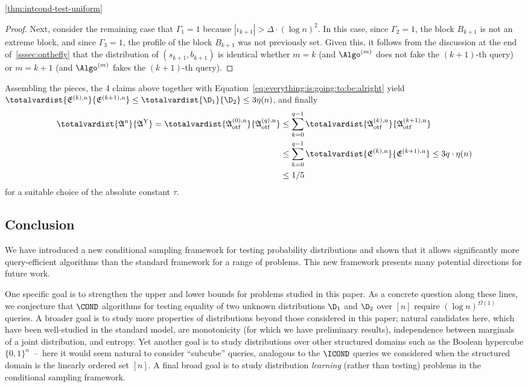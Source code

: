 \begin{proofof}{\cref{thm:intcond-test-uniform}}
\begin{proof}
Next, consider the remaining case that
$\Gamma_1=1$ because $|\iota_{k+1}| > \Delta \cdot (\log n)^2$.
In this case, since $\Gamma_2=1$, the block $B_{k+1}$ is not
an extreme block, and since $\Gamma_3=1$, the profile of the block
$B_{k+1}$ was not previously set.  Given this, it follows from the
discussion at the end of~\cref{sssec:onthefly} that the distribution of
$(s_{k+1},b_{k+1})$ is identical whether $m=k$ (and $\Algo^{(m)}$ does not fake
the $(k+1)$-th query) or $m=k+1$ (and $\Algo^{(m)}$ fakes the $(k+1)$-th query).
\end{proof}

Assembling the pieces, the 4 claims above together with Equation~\eqref{eq:everything:is:going:to:be:alright} yield $\totalvardist{ \mathfrak{E}^{(k),\rm n} }{ \mathfrak{E}^{(k+1),\rm n} } \leq \totalvardist{\D_1}{\D_2} \leq 3\eta(n)$, and finally
\begin{align*}
     \totalvardist{ \mathfrak{A}^{\rm n} }{ \mathfrak{A}^{\rm Y} } = \totalvardist{ \mathfrak{A}^{(0), \rm n}_{\rm otf} }{ \mathfrak{A}^{(q), \rm n}_{\rm otf} }
      &\leq \sum_{k=0}^{q-1} \totalvardist{ \mathfrak{A}^{(k), \rm n}_{\rm otf} }{ \mathfrak{A}^{(k+1), \rm n}_{\rm otf} } \\
     &\leq \sum_{k=0}^{q-1} \totalvardist{ \mathfrak{E}^{(k),\rm n} }{ \mathfrak{E}^{(k+1),\rm n} }
     \leq 3q\cdot \eta(n) \\
     &\leq 1/5
\end{align*}
for a suitable choice of the absolute constant $\tau$.
\end{proofof}
\subsection{Conclusion}  \label{sec:conclusion}

We have introduced a new conditional sampling framework for testing probability
distributions and shown that it allows significantly more query-efficient
algorithms than the standard framework for a range of problems.
This new framework presents many potential directions for future work.

One specific goal is to strengthen the upper and lower bounds for problems
studied in this paper. As a concrete question along these lines,
we conjecture that $\COND$ algorithms for testing equality of two unknown
distributions $\D_1$ and $\D_2$ over $[n]$ require $(\log n)^{\Omega(1)}$
queries.  A broader goal is to study more properties of distributions
beyond those considered in this paper; natural candidates here,
which have been well-studied in the standard model, are monotonicity
{(for which we have preliminary results)},
independence between marginals of a joint distribution, and entropy.
Yet another goal is to study distributions over other structured
domains such as the Boolean hypercube $\{0,1\}^n$~--~here it would seem
natural to consider ``subcube'' queries, analogous to the $\ICOND$ queries
we considered when the structured domain is the linearly ordered set $[n]$.
A final broad goal is to study distribution \emph{learning}
(rather than testing) problems in the conditional sampling framework.
